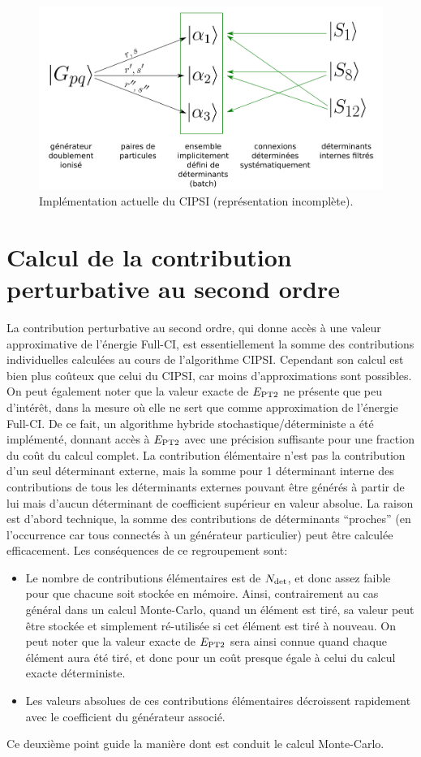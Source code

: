 \documentclass[./thesis.tex]{subfiles}
\begin{document}
\begin{figure}[h!]
        \begin{center}
                \includegraphics[width=0.6\columnwidth]{figures/cipsi/new_cipsi_fr}
        \end{center}
        \caption{Implémentation actuelle du CIPSI (représentation incomplète).}
        \label{fig:new_cipsi_fr}
\end{figure}
\section{Calcul de la contribution perturbative au second ordre}
La contribution perturbative au second ordre, qui donne accès à une valeur approximative de l'énergie Full-CI, est essentiellement la somme des contributions individuelles calculées au cours de l’algorithme CIPSI. Cependant son calcul est bien plus coûteux que celui du CIPSI, car moins d'approximations sont possibles. On peut également noter que la valeur exacte de $E_\text{PT2}$ ne présente que peu d’intérêt, dans la mesure où elle ne sert que comme approximation de l'énergie Full-CI. De ce fait, un algorithme hybride stochastique/déterministe a été implémenté, donnant accès à $E_\text{PT2}$ avec une précision suffisante pour une fraction du coût du calcul complet.
La contribution élémentaire n'est pas la contribution d'un seul déterminant externe, mais la somme pour 1 déterminant interne des contributions de tous les déterminants externes pouvant être générés à partir de lui mais d'aucun déterminant de coefficient supérieur en valeur absolue. La raison est d'abord technique, la somme des contributions de déterminants ``proches'' (en l’occurrence car tous connectés à un générateur particulier) peut être calculée efficacement. Les conséquences de ce regroupement sont:
\begin{itemize}
\item
Le nombre de contributions élémentaires est de ${N_\text{det}}$, et donc assez faible pour que chacune soit stockée en mémoire. Ainsi, contrairement au cas général dans un calcul Monte-Carlo, quand un élément est tiré, sa valeur peut être stockée et simplement ré-utilisée si cet élément est tiré à nouveau. On peut noter que la valeur exacte de $E_\text{PT2}$ sera ainsi connue quand chaque élément aura été tiré, et donc pour un coût presque égale à celui du calcul exacte déterministe.
\item
Les valeurs absolues de ces contributions élémentaires décroissent rapidement avec le coefficient du générateur associé. 
\end{itemize}
Ce deuxième point guide la manière dont est conduit le calcul Monte-Carlo.
\end{document}
